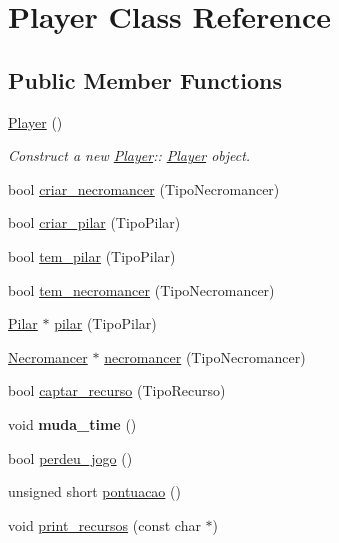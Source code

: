 \hypertarget{class_player}{}\section{Player Class Reference}
\label{class_player}
\subsection*{Public Member Functions}
\begin{DoxyCompactItemize}
\item 
\mbox{\label{class_player_affe0cc3cb714f6deb4e62f0c0d3f1fd8}} 
\mbox{\hyperlink{class_player_affe0cc3cb714f6deb4e62f0c0d3f1fd8}{Player}} ()
\begin{DoxyCompactList}\small\item\em Construct a new \mbox{\hyperlink{class_player}{Player}}\+:\+: \mbox{\hyperlink{class_player}{Player}} object. \end{DoxyCompactList}\item 
bool \mbox{\hyperlink{class_player_a118c76695a9c1f362a5371381bfe5be3}{criar\+\_\+necromancer}} (Tipo\+Necromancer)
\item 
bool \mbox{\hyperlink{class_player_a23fda6bb2c90d8033dc6ae07d1f27964}{criar\+\_\+pilar}} (Tipo\+Pilar)
\item 
bool \mbox{\hyperlink{class_player_a063de6da853c618adcf8392ba639327c}{tem\+\_\+pilar}} (Tipo\+Pilar)
\item 
bool \mbox{\hyperlink{class_player_aeff8c71e2c3e1a7529ec2190de0ac4cd}{tem\+\_\+necromancer}} (Tipo\+Necromancer)
\item 
\mbox{\hyperlink{class_pilar}{Pilar}} $\ast$ \mbox{\hyperlink{class_player_aa953125244cebb04b2363ae102c5fbf6}{pilar}} (Tipo\+Pilar)
\item 
\mbox{\hyperlink{class_necromancer}{Necromancer}} $\ast$ \mbox{\hyperlink{class_player_a560ffc698994e73527433dd2bf4d2c0d}{necromancer}} (Tipo\+Necromancer)
\item 
bool \mbox{\hyperlink{class_player_a66d2bc18dfc9b913109761a95126f086}{captar\+\_\+recurso}} (Tipo\+Recurso)
\item 
\mbox{\label{class_player_a2e69197c9ec7cebcc4e2a618c0342fbb}} 
void {\bfseries muda\+\_\+time} ()
\item 
bool \mbox{\hyperlink{class_player_aad208bab9f9f88af5ac34ebe7c31dc61}{perdeu\+\_\+jogo}} ()
\item 
unsigned short \mbox{\hyperlink{class_player_a945277689283bc50bd3afef306bf9740}{pontuacao}} ()
\item 
void \mbox{\hyperlink{class_player_a7086da1dce5a9de1c2cf29a15ace5a7d}{print\+\_\+recursos}} (const char $\ast$)
\end{DoxyCompactItemize}
